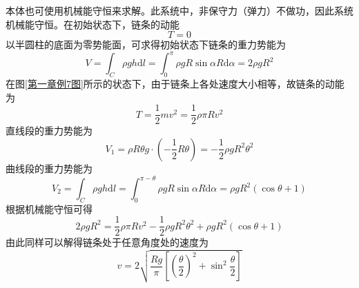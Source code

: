 \begin{solution}
本体也可使用机械能守恒来求解。此系统中，非保守力（弹力）不做功，因此系统机械能守恒。在初始状态下，链条的动能
\begin{equation*}
	T = 0
\end{equation*}
以半圆柱的底面为零势能面，可求得初始状态下链条的重力势能为
\begin{equation*}
	V = \int_C \rho gh \mathrm{d} l = \int_0^\pi \rho g R\sin \alpha R\mathrm{d} \alpha = 2\rho gR^2
\end{equation*}
在图\ref{第一章例7图}所示的状态下，由于链条上各处速度大小相等，故链条的动能为
\begin{equation*}
	T = \frac12 mv^2 = \frac12 \rho \pi R v^2
\end{equation*}
直线段的重力势能为
\begin{equation*}
	V_1 = \rho R\theta g \cdot \left(-\frac12 R\theta\right) = -\frac12 \rho gR^2 \theta^2 
\end{equation*}
曲线段的重力势能为
\begin{equation*}
	V_2 = \int_C \rho gh \mathrm{d} l = \int_0^{\pi-\theta} \rho g R\sin \alpha R\mathrm{d} \alpha = \rho gR^2 (\cos \theta + 1)
\end{equation*}
根据机械能守恒可得
\begin{equation*}
	2\rho gR^2 = \frac12 \rho \pi R v^2 -\frac12 \rho gR^2 \theta^2 + \rho gR^2 (\cos \theta + 1)
\end{equation*}
由此同样可以解得链条处于任意角度处的速度为
\begin{equation*}
	v = 2\sqrt{\frac{Rg}{\pi}\left[\left(\frac{\theta}{2}\right)^2+ \sin^2 \frac{\theta}{2}\right]}
\end{equation*}
\end{solution}


